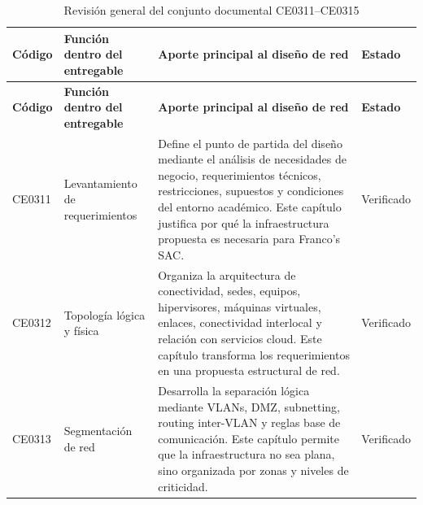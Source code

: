 \documentclass[11pt, a4paper, oneside]{report}
\begin{document}
\begin{xltabular}{\textwidth}{@{}|L{2.2cm}|L{3.6cm}|X|L{2.4cm}|@{}}
\caption{Revisión general del conjunto documental CE0311--CE0315}
\label{tab:revision_conjunto_documental_ce0311_ce0315} \\

\parbox[c][1.1cm][c]{\linewidth}{\centering\color{white}\bfseries\small Código} &
\parbox[c][1.1cm][c]{\linewidth}{\centering\color{white}\bfseries\small Función dentro del entregable} &
\parbox[c][1.1cm][c]{\linewidth}{\centering\color{white}\bfseries\small Aporte principal al diseño de red} &
\parbox[c][1.1cm][c]{\linewidth}{\centering\color{white}\bfseries\small Estado} \\ \hline
\endfirsthead

\parbox[c][1.1cm][c]{\linewidth}{\centering\color{white}\bfseries\small Código} &
\parbox[c][1.1cm][c]{\linewidth}{\centering\color{white}\bfseries\small Función dentro del entregable} &
\parbox[c][1.1cm][c]{\linewidth}{\centering\color{white}\bfseries\small Aporte principal al diseño de red} &
\parbox[c][1.1cm][c]{\linewidth}{\centering\color{white}\bfseries\small Estado} \\ \hline
\endhead

\hline
\endfoot

{\small CE0311} &
{\small Levantamiento de requerimientos} &
{\small Define el punto de partida del diseño mediante el análisis de necesidades de negocio, requerimientos técnicos, restricciones, supuestos y condiciones del entorno académico. Este capítulo justifica por qué la infraestructura propuesta es necesaria para Franco's SAC.} &
{\small Verificado} \\ \hline

{\small CE0312} &
{\small Topología lógica y física} &
{\small Organiza la arquitectura de conectividad, sedes, equipos, hipervisores, máquinas virtuales, enlaces, conectividad interlocal y relación con servicios cloud. Este capítulo transforma los requerimientos en una propuesta estructural de red.} &
{\small Verificado} \\ \hline

{\small CE0313} &
{\small Segmentación de red} &
{\small Desarrolla la separación lógica mediante VLANs, DMZ, subnetting, routing inter-VLAN y reglas base de comunicación. Este capítulo permite que la infraestructura no sea plana, sino organizada por zonas y niveles de criticidad.} &
{\small Verificado} \\ \hline


\end{xltabular}
\end{document}

